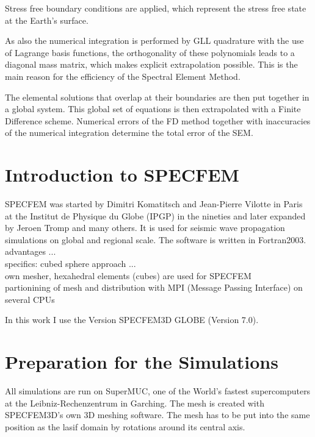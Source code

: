Stress free boundary conditions are applied, which represent the stress free state at the Earth's surface. 

As also the numerical integration is performed by GLL quadrature with the use of Lagrange basis functions, the orthogonality of these polynomials 
leads to a diagonal mass matrix, which makes explicit extrapolation possible. This is the main reason for the efficiency of the Spectral Element Method.

The elemental solutions that overlap at their boundaries are then put together in a global system. 
This global set of equations is then extrapolated with a Finite Difference scheme.
Numerical errors of the FD method together with inaccuracies of the numerical integration determine the total error of the SEM.



\section{Introduction to SPECFEM}

SPECFEM \cite{Vilotte1998} was started by Dimitri Komatitsch and Jean-Pierre Vilotte in Paris at the Institut de Physique du Globe (IPGP) in the nineties 
and later expanded by Jeroen Tromp and many others. 
It is used for seismic wave propagation simulations on global and regional scale. 
The software is written in Fortran2003. \\
advantages ... \\
specifics: cubed sphere approach ... \\
own mesher, hexahedral elements (cubes) are used for SPECFEM \\
partionining of mesh and distribution with MPI (Message Passing Interface) on several CPUs 

In this work I use the Version SPECFEM3D GLOBE (Version 7.0). 


\section{Preparation for the Simulations}

All simulations are run on SuperMUC, one of the World's fastest supercomputers at the Leibniz-Rechenzentrum in Garching. 
The mesh is created with SPECFEM3D's own 3D meshing software. The mesh has to be put into the same position as the lasif 
domain by rotations around its central axis. %


